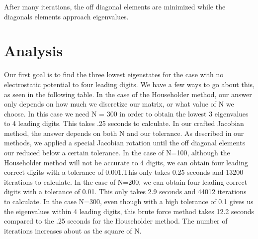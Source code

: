 \documentclass[twocolumn, groupedaddress]{revtex4-1}
\begin{document}
After many iterations, the off diagonal elements are minimized while the diagonals elements approach eigenvalues. 


\section{Analysis}
	
	Our first goal is to find the three lowest eigenstates for the case with no electrostatic potential to four leading digits. We have a few ways to go about this, as seen in the following table. In the case of the Householder method, our answer only depends on how much we discretize our matrix, or what value of N we choose. In this case we need N = 300 in order to obtain the lowest 3 eigenvalues to 4 leading digits. This takes .25 seconds to calculate. 
	In our crafted Jacobian method, the answer depends on both N and our tolerance. As described in our methods, we applied a special Jacobian rotation until the off diagonal elements our reduced below a certain tolerance. In the case of N=100, although the Householder method will not be accurate to 4 digits, we can obtain four leading correct digits with a tolerance of 0.001.This only takes 0.25 seconds and 13200 iterations to calculate.
	In the case of N=200, we can obtain four leading correct digits with a tolerance of 0.01. This only takes 2.9 seconds and 44012 iterations to calculate.
	In the case N=300, even though with a high tolerance of 0.1 gives us the eigenvalues within 4 leading digits, this brute force method takes 12.2 seconds compared to the .25 seconds for the Householder method.
	The number of iterations increases about as the square of N.
	
\end{document}
